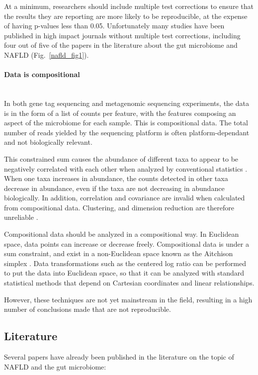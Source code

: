 At a minimum, researchers should include multiple test corrections to ensure that the results they are reporting are more likely to be reproducible, at the expense of having p-values less than 0.05. Unfortunately many studies have been published in high impact journals without multiple test corrections, including four out of five of the papers in the literature about the gut microbiome and NAFLD (Fig.~\ref{nafld_fig1}).

\paragraph{Data is compositional}\mbox{}\\
In both gene tag sequencing and metagenomic sequencing experiments, the data is in the form of a list of counts per feature, with the features composing an aspect of the microbiome for each sample. This is compositional data. The total number of reads yielded by the sequencing platform is often platform-dependant and not biologically relevant.

This constrained sum causes the abundance of different taxa to appear to be negatively correlated with each other when analyzed by conventional statistics \cite{gloor2016s}. When one taxa increases in abundance, the counts detected in other taxa decrease in abundance, even if the taxa are not decreasing in abundance biologically. In addition, correlation and covariance are invalid when calculated from compositional data. Clustering, and dimension reduction are therefore unreliable \cite{lovell2015proportionality}.

Compositional data should be analyzed in a compositional way. In Euclidean space, data points can increase or decrease freely. Compositional data is under a sum constraint, and exist in a non-Euclidean space known as the Aitchison simplex \cite{aitchison1982statistical}. Data transformations such as the centered log ratio can be performed to put the data into Euclidean space, so that it can be analyzed with standard statistical methods that depend on Cartesian coordinates and linear relationships.

However, these techniques are not yet mainstream in the field, resulting in a high number of conclusions made that are not reproducible.

\subsection{Literature}
Several papers have already been published in the literature on the topic of NAFLD and the gut microbiome:

